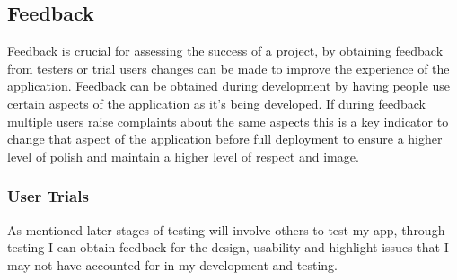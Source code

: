 \subsection{Feedback}\label{feedback}

Feedback is crucial for assessing the success of a project, by obtaining
feedback from testers or trial users changes can be made to improve the
experience of the application. Feedback can be obtained during
development by having people use certain aspects of the application as
it's being developed. If during feedback multiple users raise complaints
about the same aspects this is a key indicator to change that aspect of
the application before full deployment to ensure a higher level of
polish and maintain a higher level of respect and image.

\subsubsection{User Trials}\label{user-trials}

As mentioned later stages of testing will involve others to test my app,
through testing I can obtain feedback for the design, usability and
highlight issues that I may not have accounted for in my development and
testing.
